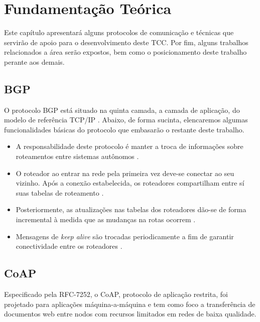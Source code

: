 \chapter{\label{chap:chap2} Fundamentação Teórica}

Este capítulo apresentará alguns protocolos de comunicação e técnicas que servirão de apoio para o desenvolvimento deste TCC. 
Por fim, alguns trabalhos relacionados a área serão expostos, bem como o posicionamento deste trabalho perante aos demais.


\section{BGP}


O protocolo BGP está situado na quinta camada, a camada de aplicação, do modelo de referência TCP/IP \cite{tanenbaum2011redes}.
Abaixo, de forma sucinta, elencaremos algumas funcionalidades básicas do protocolo que embasarão o restante deste trabalho.

\begin{itemize}
    \item A responsabilidade deste protocolo é manter a troca de informações sobre roteamentos entre sistemas autônomos \cite{Rekhter:1995}.
    \item O roteador ao entrar na rede pela primeira vez deve-se conectar ao seu vizinho. Após a conexão estabelecida, os roteadores compartilham entre sí suas tabelas de roteamento \cite{Rekhter:1995}.
    \item Posteriormente, as atualizações nas tabelas dos roteadores dão-se de forma incremental à medida que as mudanças na rotas ocorrem \cite{Rekhter:1995}.
    \item Mensagens de \textit{keep alive} são trocadas periodicamente a fim de garantir conectividade entre os roteadores \cite{Rekhter:1995}.
\end{itemize}

\section{CoAP}

Especificado pela RFC-7252, o CoAP, protocolo de aplicação restrita, foi projetado para aplicações máquina-a-máquina
e tem como foco a transferência de documentos web entre nodos com recursos limitados em redes de baixa qualidade\cite{rfc7252}.


